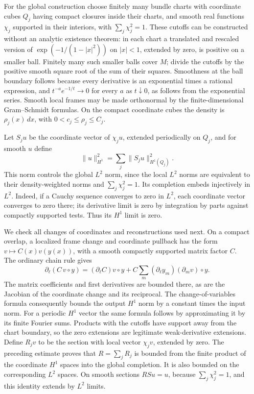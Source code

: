 \documentclass[
  11pt,
]{article}
\begin{document}
For the global construction choose finitely many bundle charts with
coordinate cubes \(Q_j\) having compact closures inside their charts,
and smooth real functions \(\chi_j\) supported in their interiors, with
\(\sum_j\chi_j^2=1\). These cutoffs can be constructed without an
analytic existence theorem: in each chart a translated and rescaled
version of \(\exp(-1/(1-|x|^2))\) on \(|x|<1\), extended by zero, is
positive on a smaller ball. Finitely many such smaller balls cover
\(M\); divide the cutoffs by the positive smooth square root of the sum
of their squares. Smoothness at the ball boundary follows because every
derivative is an exponential times a rational expression, and
\(t^{-a}e^{-1/t}\to0\) for every \(a\) as \(t\downarrow0\), as follows
from the exponential series. Smooth local frames may be made orthonormal
by the finite-dimensional Gram--Schmidt formulas. On the compact
coordinate cubes the density is \(\rho_j(x)\,dx\), with
\(0<c_j\leq\rho_j\leq C_j\).

Let \(S_ju\) be the coordinate vector of \(\chi_ju\), extended
periodically on \(Q_j\), and for smooth \(u\) define \[
\|u\|_{H^1}^2=\sum_j\|S_ju\|_{H^1(Q_j)}^2 .
\] This norm controls the global \(L^2\) norm, since the local \(L^2\)
norms are equivalent to their density-weighted norms and
\(\sum_j\chi_j^2=1\). Its completion embeds injectively in \(L^2\).
Indeed, if a Cauchy sequence converges to zero in \(L^2\), each
coordinate vector converges to zero there; its derivative limit is zero
by integration by parts against compactly supported tests. Thus its
\(H^1\) limit is zero.

We check all changes of coordinates and reconstructions used next. On a
compact overlap, a localized frame change and coordinate pullback has
the form \(v\mapsto C(x)v(y(x))\), with a smooth compactly supported
matrix factor \(C\). The ordinary chain rule gives \[
\partial_\ell(C\,v\circ y)
=(\partial_\ell C)v\circ y
+ C\sum_m(\partial_\ell y_m)(\partial_m v)\circ y .
\] The matrix coefficients and first derivatives are bounded there, as
are the Jacobian of the coordinate change and its reciprocal. The
change-of-variables formula consequently bounds the output \(H^1\) norm
by a constant times the input norm. For a periodic \(H^1\) vector the
same formula follows by approximating it by its finite Fourier sums.
Products with the cutoffs have support away from the chart boundary, so
the zero extensions are legitimate weak-derivative extensions. Define
\(R_jv\) to be the section with local vector \(\chi_jv\), extended by
zero. The preceding estimate proves that \(R=\sum_jR_j\) is bounded from
the finite product of the coordinate \(H^1\) spaces into the global
completion. It is also bounded on the corresponding \(L^2\) spaces. On
smooth sections \(RSu=u\), because \(\sum_j\chi_j^2=1\), and this
identity extends by \(L^2\) limits.
\end{document}
